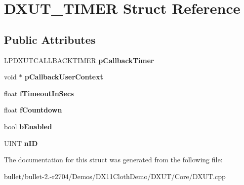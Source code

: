 \hypertarget{struct_d_x_u_t___t_i_m_e_r}{\section{D\+X\+U\+T\+\_\+\+T\+I\+M\+E\+R Struct Reference}
\label{struct_d_x_u_t___t_i_m_e_r}
}
\subsection*{Public Attributes}
\begin{DoxyCompactItemize}
\item 
\hypertarget{struct_d_x_u_t___t_i_m_e_r_aebbdf57604305732406ad29ae90214f0}{L\+P\+D\+X\+U\+T\+C\+A\+L\+L\+B\+A\+C\+K\+T\+I\+M\+E\+R {\bfseries p\+Callback\+Timer}}\label{struct_d_x_u_t___t_i_m_e_r_aebbdf57604305732406ad29ae90214f0}

\item 
\hypertarget{struct_d_x_u_t___t_i_m_e_r_a5c7f0df10a281ce4edfc8fd74e7120bf}{void $\ast$ {\bfseries p\+Callback\+User\+Context}}\label{struct_d_x_u_t___t_i_m_e_r_a5c7f0df10a281ce4edfc8fd74e7120bf}

\item 
\hypertarget{struct_d_x_u_t___t_i_m_e_r_aa40bd49701003a16a462639b5e491d3f}{float {\bfseries f\+Timeout\+In\+Secs}}\label{struct_d_x_u_t___t_i_m_e_r_aa40bd49701003a16a462639b5e491d3f}

\item 
\hypertarget{struct_d_x_u_t___t_i_m_e_r_a792bef915749e62ee6cabd06f9e5c722}{float {\bfseries f\+Countdown}}\label{struct_d_x_u_t___t_i_m_e_r_a792bef915749e62ee6cabd06f9e5c722}

\item 
\hypertarget{struct_d_x_u_t___t_i_m_e_r_a751d6b0959c550a79993ac467416ab87}{bool {\bfseries b\+Enabled}}\label{struct_d_x_u_t___t_i_m_e_r_a751d6b0959c550a79993ac467416ab87}

\item 
\hypertarget{struct_d_x_u_t___t_i_m_e_r_a20ce9c19ffc97821df8b048541a01348}{U\+I\+N\+T {\bfseries n\+I\+D}}\label{struct_d_x_u_t___t_i_m_e_r_a20ce9c19ffc97821df8b048541a01348}

\end{DoxyCompactItemize}


The documentation for this struct was generated from the following file\+:\begin{DoxyCompactItemize}
\item 
bullet/bullet-\/2.-\/r2704/\+Demos/\+D\+X11\+Cloth\+Demo/\+D\+X\+U\+T/\+Core/D\+X\+U\+T.\+cpp\end{DoxyCompactItemize}
